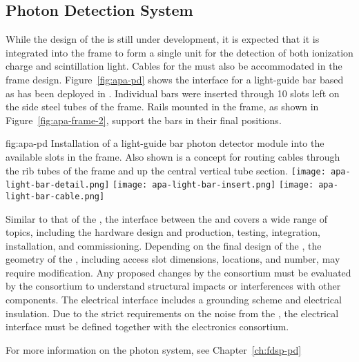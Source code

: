 \subsection{Photon Detection System}
\label{sec:fdsp-apa-intfc-pds}

While the design of the  is still under development, it is expected that it is integrated into the  frame to form a single unit for the detection of both ionization charge and scintillation light.  Cables for the  must also be accommodated in the  frame design.  Figure~\ref{fig:apa-pd} shows the interface for a light-guide bar based  as has been deployed in . Individual bars were inserted through \num{10} slots left on the side steel tubes of the frame. Rails mounted in the  frame, as shown in Figure~\ref{fig:apa-frame-2}, support the bars in their final positions. 

\begin{dunefigure}{fig:apa-pd}
{Installation of a light-guide bar photon detector module into the available slots in the  frame. Also shown is a concept for routing  cables through the rib tubes of the  frame and up the central vertical tube section.}
\texttt{[image: apa-light-bar-detail.png]}\qquad\qquad
\texttt{[image: apa-light-bar-insert.png]}\qquad\qquad
\texttt{[image: apa-light-bar-cable.png]}
\end{dunefigure}

Similar to that of the , the interface between the  and  covers a wide range of topics, including the hardware design and production, testing, integration, installation, and commissioning. Depending on the final design of the , the geometry of the , including access slot dimensions, locations, and number, may require modification. Any proposed changes by the  consortium must be evaluated by the  consortium to understand structural impacts or interferences with other components.  The electrical interface includes a grounding scheme and electrical insulation. Due to the strict requirements on the noise from the , the electrical interface must be defined together with the \single electronics consortium. 

For more information on the photon system, see Chapter~\ref{ch:fdsp-pd} %


